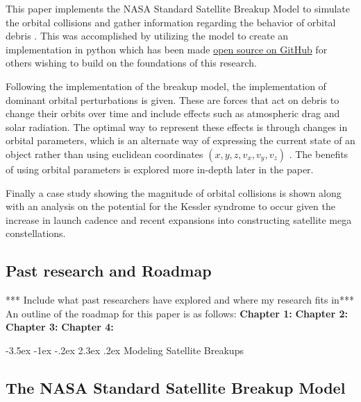 \documentclass{article}
\makeatletter
\renewcommand\section{\clearpage\newpage\@startsection {section}{1}{\z@}%
	{-3.5ex \@plus -1ex \@minus -.2ex}%
	{2.3ex \@plus.2ex}%
	{\normalfont\Large\bfseries}}
\makeatother
\begin{document}
This paper implements the NASA Standard Satellite Breakup Model to simulate the orbital collisions and gather information regarding the behavior of orbital debris \citep{johnson_nasas_2001}. This was accomplished by utilizing the model to create an implementation in python which has been made \href{https://github.com/ReeceHumphreys/OrbitalDebris}{open source on GitHub} for others wishing to build on the foundations of this research.

Following the implementation of the breakup model, the implementation of dominant orbital perturbations is given. These are forces that act on debris to change their orbits over time and include effects such as atmospheric drag and solar radiation. The optimal way to represent these effects is through changes in orbital parameters, which is an alternate way of expressing the current state of an object rather than using euclidean coordinates $(x,y,z, v_x, v_y, v_z)$ . The benefits of using orbital parameters is explored more in-depth later in the paper.

Finally a case study showing the magnitude of orbital collisions is shown along with an analysis on the potential for the Kessler syndrome to occur given the increase in launch cadence and recent expansions into constructing satellite mega constellations.

\subsection{Past research and Roadmap}
*** Include what past researchers have explored and where my research fits in*** \newline
An outline of the roadmap for this paper is as follows: \newline 
\textbf{Chapter 1:}  \newline 
\textbf{Chapter 2:}  \newline 
\textbf{Chapter 3:}  \newline 
\textbf{Chapter 4:}   \newline 
\singlespace

\section{Modeling Satellite Breakups}
\label{Modeling Satellite Breakups}
\doublespace


\subsection{The NASA Standard Satellite Breakup Model}
\end{document}
